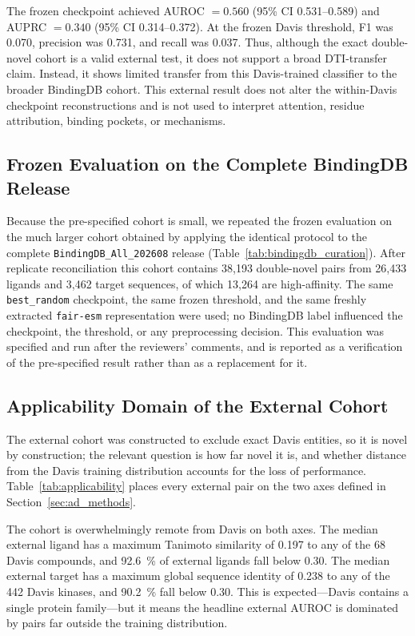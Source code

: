 \documentclass[fleqn,10pt]{wlscirep}
\begin{document}
The frozen checkpoint achieved AUROC $=0.560$ (95\% CI 0.531--0.589) and
AUPRC $=0.340$ (95\% CI 0.314--0.372).  At the frozen Davis threshold, F1 was
0.070, precision was 0.731, and recall was 0.037.  Thus, although the exact
double-novel cohort is a valid external test, it does not support a broad DTI-transfer claim.
Instead, it shows limited transfer from this
Davis-trained classifier to the broader BindingDB cohort.  This external result
does not alter the within-Davis checkpoint reconstructions and is not used to
interpret attention, residue attribution, binding pockets, or mechanisms.

\subsection{Frozen Evaluation on the Complete BindingDB Release}
\label{sec:bindingdb_full}

Because the pre-specified cohort is small, we repeated the frozen evaluation on
the much larger cohort obtained by applying the identical protocol to the
complete \texttt{BindingDB\_All\_202608} release
(Table~\ref{tab:bindingdb_curation}).  After replicate reconciliation this
cohort contains 38{,}193 double-novel pairs from 26{,}433 ligands and 3{,}462
target sequences, of which 13{,}264 are high-affinity.  The same
\texttt{best\_random} checkpoint, the same frozen threshold, and the same
freshly extracted \texttt{fair-esm} representation were used; no BindingDB label
influenced the checkpoint, the threshold, or any preprocessing decision.  This
evaluation was specified and run after the reviewers' comments, and is reported
as a verification of the pre-specified result rather than as a replacement
for it.


\subsection{Applicability Domain of the External Cohort}
\label{sec:applicability}

The external cohort was constructed to exclude exact Davis entities, so it is
novel by construction; the relevant question is how far novel it is, and whether
distance from the Davis training distribution accounts for the loss of
performance.  Table~\ref{tab:applicability} places every external pair on the
two axes defined in Section~\ref{sec:ad_methods}.

The cohort is overwhelmingly remote from Davis on both axes.  The median
external ligand has a maximum Tanimoto similarity of 0.197 to any of the 68
Davis compounds, and \SI{92.6}{\percent} of external ligands fall below 0.30.
The median external target has a maximum global sequence identity of 0.238 to
any of the 442 Davis kinases, and \SI{90.2}{\percent} fall below 0.30.  This is
expected---Davis contains a single protein family---but it means the headline
external AUROC is dominated by pairs far outside the training distribution.
\end{document}
